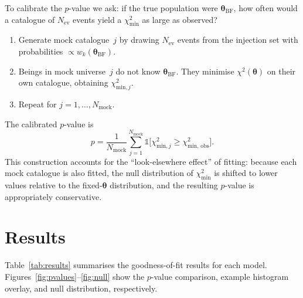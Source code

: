 \documentclass[11pt,a4paper]{article}
\newcommand{\Nev}{\ensuremath{N_\mathrm{ev}}\xspace}
\newcommand{\Nmock}{\ensuremath{N_\mathrm{mock}}\xspace}
\begin{document}
To calibrate the $p$-value we ask: if the true population were
$\boldsymbol{\theta}_\mathrm{BF}$, how often would a catalogue of \Nev
events yield a $\chi^2_\mathrm{min}$ as large as observed?
\begin{enumerate}
  \item Generate mock catalogue~$j$ by drawing \Nev events from the
        injection set with probabilities
        $\propto w_k(\boldsymbol{\theta}_\mathrm{BF})$.
  \item Beings in mock universe~$j$ do not know
        $\boldsymbol{\theta}_\mathrm{BF}$.  They minimise
        $\chi^2(\boldsymbol{\theta})$ on their own catalogue, obtaining
        $\chi^2_{\mathrm{min},j}$.
  \item Repeat for $j = 1, \dots, \Nmock$.
\end{enumerate}
The calibrated $p$-value is
\begin{equation}
  p = \frac{1}{\Nmock}
      \sum_{j=1}^{\Nmock}
      \mathbb{1}\!\bigl[\chi^2_{\mathrm{min},j}
      \ge \chi^2_\mathrm{min,\,obs}\bigr].
\end{equation}
This construction accounts for the ``look-elsewhere effect'' of fitting:
because each mock catalogue is also fitted, the null distribution of
$\chi^2_\mathrm{min}$ is shifted to lower values relative to the
fixed-$\boldsymbol{\theta}$ distribution, and the resulting $p$-value is
appropriately conservative.

\section{Results}\label{sec:results}

Table~\ref{tab:results} summarises the goodness-of-fit results for each
model.  Figures~\ref{fig:pvalues}--\ref{fig:null} show the $p$-value
comparison, example histogram overlay, and null distribution, respectively.
\end{document}
